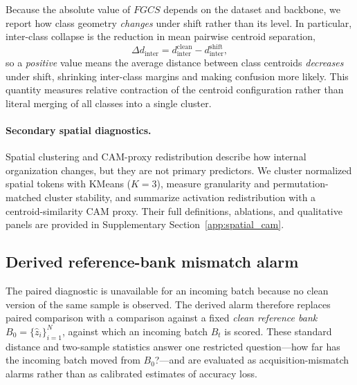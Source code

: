 \documentclass[a4paper,fleqn]{els-cas-templates/cas-sc}
\begin{document}
Because the absolute value of $FGCS$ depends on the dataset and backbone, we
report how class geometry \emph{changes} under shift rather than its level. In
particular, inter-class collapse is the reduction in mean pairwise centroid
separation,
\begin{equation}
  \Delta d_{\mathrm{inter}}
  = d_{\mathrm{inter}}^{\mathrm{clean}} - d_{\mathrm{inter}}^{\mathrm{shift}},
\end{equation}
so a \emph{positive} value means the average distance between class centroids
\emph{decreases} under shift, shrinking inter-class margins and making confusion
more likely. This quantity measures relative contraction of the centroid
configuration rather than literal merging of all classes into a single cluster.

\paragraph{Secondary spatial diagnostics.}
Spatial clustering and CAM-proxy redistribution describe how internal
organization changes, but they are not primary predictors. We cluster normalized
spatial tokens with KMeans ($K=3$), measure granularity and permutation-matched
cluster stability, and summarize activation redistribution with a
centroid-similarity CAM proxy. Their full definitions, ablations, and qualitative
panels are provided in Supplementary Section~\ref{app:spatial_cam}.

\subsection{Derived reference-bank mismatch alarm}
\label{sec:refbank_method}

The paired diagnostic is unavailable for an incoming batch because no clean
version of the same sample is observed. The derived alarm therefore replaces
paired comparison with a comparison against a fixed \emph{clean reference bank}
$B_0=\{\hat{z}_i\}_{i=1}^{N}$, against which an incoming batch $B_t$ is scored.
These standard distance and two-sample statistics answer one restricted
question---how far has the incoming batch moved from $B_0$?---and are evaluated
as acquisition-mismatch alarms rather than as calibrated estimates of accuracy
loss.
\end{document}
